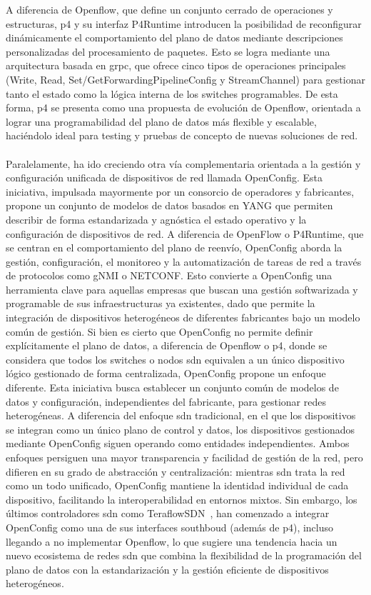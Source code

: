 A diferencia de Openflow, que define un conjunto cerrado de operaciones y estructuras, \gls{p4} y su interfaz P4Runtime introducen la posibilidad de reconfigurar dinámicamente el comportamiento del plano de datos mediante descripciones personalizadas del procesamiento de paquetes. Esto se logra mediante una arquitectura basada en \gls{grpc}, que ofrece cinco tipos de operaciones principales (Write, Read, Set/GetForwardingPipelineConfig y StreamChannel) para gestionar tanto el estado como la lógica interna de los switches programables. De esta forma, \gls{p4} se presenta como una propuesta de evolución de Openflow, orientada a lograr una programabilidad del plano de datos más flexible y escalable, haciéndolo ideal para testing y pruebas de concepto de nuevas soluciones de red.\\
\\
Paralelamente, ha ido creciendo otra vía complementaria orientada a la gestión y configuración unificada de dispositivos de red llamada OpenConfig. Esta iniciativa, impulsada mayormente por un consorcio de operadores y fabricantes, propone un conjunto de modelos de datos basados en YANG que permiten describir de forma estandarizada y agnóstica el estado operativo y la configuración de dispositivos de red. A diferencia de OpenFlow o P4Runtime, que se centran en el comportamiento del plano de reenvío, OpenConfig aborda la gestión, configuración, el monitoreo y la automatización de tareas de red a través de protocolos como gNMI o NETCONF. Esto convierte a OpenConfig una herramienta clave para aquellas empresas que buscan una gestión softwarizada y programable de sus infraestructuras ya existentes, dado que permite la integración de dispositivos heterogéneos de diferentes fabricantes bajo un modelo común de gestión. Si bien es cierto que OpenConfig no permite definir explícitamente el plano de datos, a diferencia de Openflow o \gls{p4}, donde se considera que todos los switches o nodos \gls{sdn} equivalen a un único dispositivo lógico gestionado de forma centralizada, OpenConfig propone un enfoque diferente. Esta iniciativa busca establecer un conjunto común de modelos de datos y configuración, independientes del fabricante, para gestionar redes heterogéneas. A diferencia del enfoque \gls{sdn} tradicional, en el que los dispositivos se integran como un único plano de control y datos, los dispositivos gestionados mediante OpenConfig siguen operando como entidades independientes. Ambos enfoques persiguen una mayor transparencia y facilidad de gestión de la red, pero difieren en su grado de abstracción y centralización: mientras \gls{sdn} trata la red como un todo unificado, OpenConfig mantiene la identidad individual de cada dispositivo, facilitando la interoperabilidad en entornos mixtos. Sin embargo, los últimos controladores \gls{sdn} como TeraflowSDN~\cite{teraflowsdn2021}, han comenzado a integrar OpenConfig como una de sus interfaces southboud (además de \gls{p4}), incluso llegando a no implementar Openflow, lo que sugiere una tendencia hacia un nuevo ecosistema de redes \gls{sdn} que combina la flexibilidad de la programación del plano de datos con la estandarización y la gestión eficiente de dispositivos heterogéneos.\\
